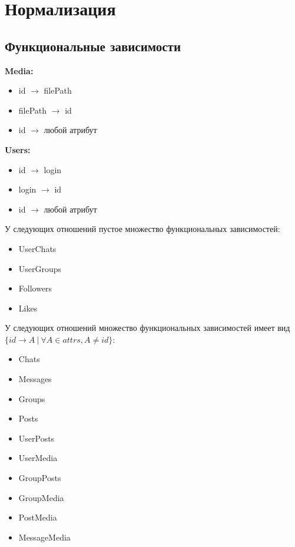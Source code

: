 \documentclass[12pt, a4paper] {ncc}
\begin{document}
\section{Нормализация}
\subsection{Функциональные зависимости}
\textbf{Media:}
\begin{itemize}
\item id $\rightarrow$ filePath
\item filePath $\rightarrow$ id
\item id $\rightarrow$ любой атрибут
\end{itemize}
\textbf{Users:}
\begin{itemize}
\item id $\rightarrow$ login
\item login $\rightarrow$ id
\item id $\rightarrow$ любой атрибут
\end{itemize}
У следующих отношений пустое множество функциональных зависимостей:
\begin{itemize}
\item UserChats
\item UserGroups
\item Followers
\item Likes
\end{itemize}
У следующих отношений множество функциональных зависимостей имеет вид \\
$\{id \rightarrow A ~ | ~ \forall A \in \textit{attrs}, A \ne id\}$:
\begin{itemize}
\item Chats
\item Messages
\item Groups
\item Posts
\item UserPosts
\item UserMedia
\item GroupPosts
\item GroupMedia
\item PostMedia
\item MessageMedia
\end{itemize}
\end{document}
